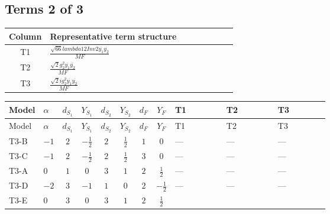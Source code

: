 \documentclass[8pt]{article}
\begin{document}
\begin{landscape}
\subsection*{Terms 2 of 3}
\begin{center}
\begin{tabular}{@{}c >{\raggedright\arraybackslash}p{0.82\linewidth}@{}}
\toprule
Column & Representative term structure \\
\midrule
T1 & \(\displaystyle \frac{\sqrt{66} lambda12Inv2 \overline{y_{1}} \overline{y_{2}}}{MF}\) \\
\midrule
T2 & \(\displaystyle \frac{\sqrt{2} g_{2}^{2} \overline{y_{1}} \overline{y_{2}}}{MF}\) \\
\midrule
T3 & \(\displaystyle \frac{\sqrt{2} i g_{2}^{2} \overline{y_{1}} \overline{y_{2}}}{MF}\) \\
\midrule
\bottomrule
\end{tabular}
\end{center}
\smallskip
\tiny
\begin{longtable}{@{}llcccccc >{\raggedright\arraybackslash}p{0.21\linewidth} >{\raggedright\arraybackslash}p{0.21\linewidth} >{\raggedright\arraybackslash}p{0.21\linewidth}@{}}
\toprule
Model & $\alpha$ & $d_{S_1}$ & $Y_{S_1}$ & $d_{S_2}$ & $Y_{S_2}$ & $d_F$ & $Y_F$ & T1 & T2 & T3 \\
\midrule
\endfirsthead
\toprule
Model & $\alpha$ & $d_{S_1}$ & $Y_{S_1}$ & $d_{S_2}$ & $Y_{S_2}$ & $d_F$ & $Y_F$ & T1 & T2 & T3 \\
\midrule
\endhead
T3-B & $-1$ & $2$ & $-\frac{1}{2}$ & $2$ & $\frac{1}{2}$ & $1$ & $0$ & --- & --- & --- \\
\midrule
T3-C & $-1$ & $2$ & $-\frac{1}{2}$ & $2$ & $\frac{1}{2}$ & $3$ & $0$ & --- & --- & --- \\
\midrule
T3-A & $0$ & $1$ & $0$ & $3$ & $1$ & $2$ & $\frac{1}{2}$ & --- & --- & --- \\
\midrule
T3-D & $-2$ & $3$ & $-1$ & $1$ & $0$ & $2$ & $-\frac{1}{2}$ & --- & --- & --- \\
\midrule
T3-E & $0$ & $3$ & $0$ & $3$ & $1$ & $2$ & $\frac{1}{2}$ & \scriptsize\adjustbox{max width=\linewidth}{$\begin{gathered} \frac{3 \sqrt{66} lambda12Inv2 \overline{y_{1}} \overline{y_{2}}}{44 MF}\end{gathered}$} & \scriptsize\adjustbox{max width=\linewidth}{$\begin{gathered} \frac{49 \sqrt{2} g_{2}^{2} \overline{y_{1}} \overline{y_{2}}}{16 MF}\end{gathered}$} & \scriptsize\adjustbox{max width=\linewidth}{$\begin{gathered} - \frac{\sqrt{2} i g_{2}^{2} \overline{y_{1}} \overline{y_{2}}}{4 MF}\end{gathered}$} \\
\midrule
\bottomrule
\end{longtable}
\clearpage

\end{landscape}
\end{document}

